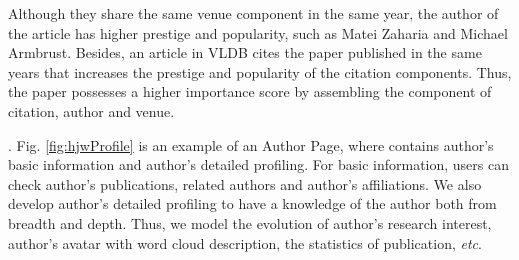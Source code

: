 \par
Although they share the same venue component in the same year, the author of the article has higher prestige and popularity, such as Matei Zaharia and Michael Armbrust. Besides, an article in VLDB cites the paper published in the same years that increases the prestige and popularity of the citation components. Thus, the paper possesses a higher importance score by assembling the component of citation, author and venue.

. Fig. \ref{fig:hjwProfile} is an example of an Author Page, where contains author's basic information and author's detailed profiling. For basic information, users can check author's publications, related authors and author's affiliations. We also develop author's detailed profiling to have a knowledge of the author both from breadth and depth. Thus, we model the evolution of author's research interest, author's avatar with word cloud description, the statistics of publication, {\em etc}.


